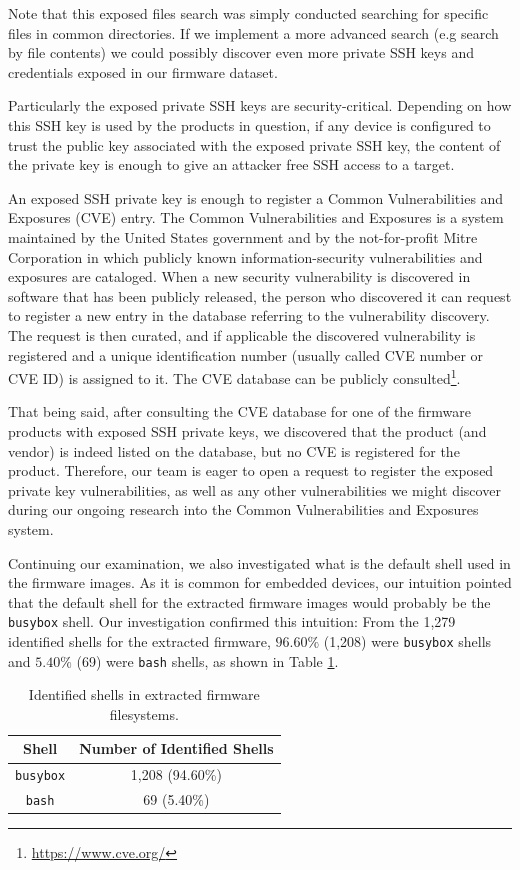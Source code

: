 Note that this exposed files search was simply conducted searching for specific files in common directories. If we implement a more advanced search (e.g search by file contents) we could possibly discover even more private SSH keys and credentials exposed in our firmware dataset.

Particularly the exposed private SSH keys are security-critical. Depending on how this SSH key is used by the products in question, if any device is configured to trust the public key associated with the exposed private SSH key, the content of the private key is enough to give an attacker free SSH access to a target.

An exposed SSH private key is enough to register a Common Vulnerabilities and Exposures (CVE) entry. The Common Vulnerabilities and Exposures is a system maintained by the United States government and by the not-for-profit Mitre Corporation in which publicly known information-security vulnerabilities and exposures are cataloged. When a new security vulnerability is discovered in software that has been publicly released, the person who discovered it can request to register a new entry in the database referring to the vulnerability discovery. The request is then curated, and if applicable the discovered vulnerability is registered and a unique identification number (usually called CVE number or CVE ID) is assigned to it. The CVE database can be publicly consulted\footnote{\url{https://www.cve.org/}}.

That being said, after consulting the CVE database for one of the firmware products with exposed SSH private keys, we discovered that the product (and vendor) is indeed listed on the database, but no CVE is registered for the product. Therefore, our team is eager to open a request to register the exposed private key vulnerabilities, as well as any other vulnerabilities we might discover during our ongoing research into the Common Vulnerabilities and Exposures system.

Continuing our examination, we also investigated what is the default shell used in the firmware images. As it is common for embedded devices, our intuition pointed that the default shell for the extracted firmware images would probably be the {\tt busybox} shell. Our investigation confirmed this intuition: From the 1,279 identified shells for the extracted firmware, $96.60\%$ (1,208) were {\tt busybox} shells and $5.40\%$ (69) were {\tt bash} shells, as shown in Table \ref{tab:shell-count}.

\begin{table}[H]
\centering
\caption{Identified shells in extracted firmware filesystems.}
\begin{tabular}{|c|c|}
\hline
\textbf{Shell} & \textbf{Number of Identified Shells} \\ \hline
{\tt busybox}        & 1,208 (94.60\%)              \\
{\tt bash}           & 69 (5.40\%)                 \\ \hline
\end{tabular}
\label{tab:shell-count}
\end{table}


